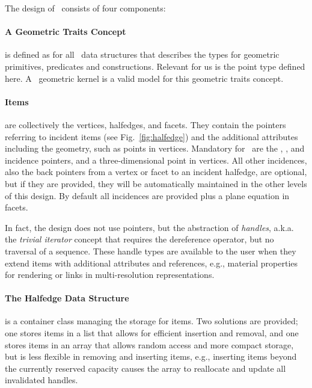 \label{sec:poly}

The design of \cgalpoly\ consists of four components:

\paragraph*{A Geometric Traits Concept} is defined as for all \cgal\
data structures that describes the types for geometric primitives,
predicates and constructions. Relevant for us is the point type
defined here. A \cgal\ geometric kernel is a valid model for this
geometric traits concept.

\paragraph*{Items}  are collectively the  vertices, halfedges, and
facets. They contain the pointers referring to incident items (see
Fig.~\ref{fig:halfedge}) and the additional attributes including the
geometry, such as points in vertices. Mandatory for \cgalpoly\ are the
\CodeFmt{next}, \CodeFmt{opposite}, and \CodeFmt{vertex} incidence
pointers, and a three-dimensional point in vertices. All other
incidences, also the back pointers from a vertex or facet to an
incident halfedge, are optional, but if they are provided, they will
be automatically maintained in the other levels of this design. By
default all incidences are provided plus a plane equation in facets.

In fact, the design does not use pointers, but the abstraction of
\emph{handles}, a.k.a. the \emph{trivial iterator\/} concept that
requires the dereference operator, but no traversal of a sequence.
These handle types are available to the user when they extend items
with additional attributes and references, e.g., material properties
for rendering or links in multi-resolution representations.

\paragraph*{The Halfedge Data Structure} is a container class managing
the storage for items. Two solutions are provided; one stores items in
a list that allows for efficient insertion and removal, and one
stores items in an array that allows random access and more compact
storage, but is less flexible in removing and inserting items, e.g.,
inserting items beyond the currently reserved capacity causes the
array to reallocate and update all invalidated handles.

